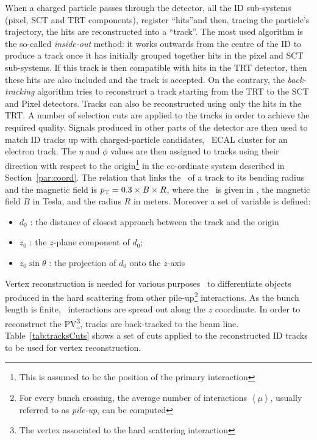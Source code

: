 			When a charged particle passes through the detector, all the \ac{ID} sub-systems (pixel, \ac{SCT} and \ac{TRT} components), register ``hits''and then, tracing the particle's trajectory, the hits are reconstructed into a ``track''. The most used algorithm is the so-called \emph{inside-out} method: it works outwards from the centre of the \ac{ID} to produce a track once it has initially grouped together hits in the pixel and \ac{SCT} sub-systems. If this track is then compatible with hits in the \ac{TRT} detector, then these hits are also included and the track is accepted. On the contrary, the \emph{back-tracking} algorithm tries to reconstruct a track starting from the \ac{TRT} to the \ac{SCT} and Pixel detectors. Tracks can also be reconstructed using only the hits in the \ac{TRT}. A number of selection cuts are applied to the tracks in order to achieve the required quality. Signals produced in other parts of the detector are then used to match \ac{ID} tracks up with charged-particle candidates, \eg\ \ac{ECAL} cluster for an electron track. The $\eta$ and $\phi$ values are then assigned to tracks using their direction with respect to the origin\footnote{This is assumed to be the position of the primary interaction} in the co-ordinate system described in Section~\ref{par:coord}. The relation that links the \pt\ of a track to its bending radius and the magnetic field is $p_{\mathrm{T}} = 0.3 \times B \times R$, where the \pt\ is given in \GeV, the magnetic field $B$ in Tesla, and the radius $R$ in meters. Moreover a set of variable is defined:

			\begin{itemize}
				\item $d_0$ : the distance of closest approach between the track and the origin
				\item $z_0$ : the $z$-plane component of $d_0$;
				\item $z_0 \sin \theta$ : the projection of $d_0$ onto the $z$-axis
			\end{itemize}

			Vertex reconstruction is needed for various purposes \eg\ to differentiate objects produced in the hard scattering from other pile-up\footnote{For every bunch crossing, the average number of interactions $\left < \mu \right >$, usually referred to as \emph{pile-up}, can be computed} interactions. As the bunch length is finite, \pp\ interactions are spread out along the $z$ coordinate. In order to reconstruct the \ac{PV}\footnote{The vertex associated to the hard scattering interaction}, tracks are back-tracked to the beam line. Table~\ref{tab:tracksCuts} shows a set of cuts applied to the reconstructed \ac{ID} tracks to be used for vertex reconstruction.

